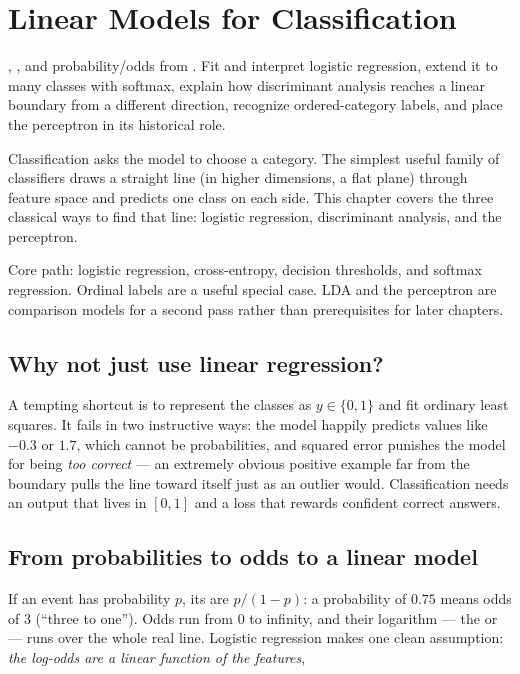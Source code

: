 \chapter{Linear Models for Classification}
\label{ch:classification}

\chapterguide%
  {, , and probability/odds from .}
  {Fit and interpret logistic regression, extend it to many classes with softmax, explain how discriminant analysis reaches a linear boundary from a different direction, recognize ordered-category labels, and place the perceptron in its historical role.}

Classification asks the model to choose a category. The simplest useful family of classifiers draws a straight line (in higher dimensions, a flat plane) through feature space and predicts one class on each side. This chapter covers the three classical ways to find that line: logistic regression, discriminant analysis, and the perceptron.

\begin{firstread}
Core path: logistic regression, cross-entropy, decision thresholds, and softmax regression. Ordinal labels are a useful special case. LDA and the perceptron are comparison models for a second pass rather than prerequisites for later chapters.
\end{firstread}

\section{Why not just use linear regression?}

A tempting shortcut is to represent the classes as $y\in\{0,1\}$ and fit ordinary least squares. It fails in two instructive ways: the model happily predicts values like $-0.3$ or $1.7$, which cannot be probabilities, and squared error punishes the model for being \emph{too correct} --- an extremely obvious positive example far from the boundary pulls the line toward itself just as an outlier would. Classification needs an output that lives in $[0,1]$ and a loss that rewards confident correct answers.

\section{From probabilities to odds to a linear model}

If an event has probability $p$, its  are $p/(1-p)$: a probability of $0.75$ means odds of $3$ (``three to one''). Odds run from $0$ to infinity, and their logarithm --- the  or  --- runs over the whole real line. Logistic regression makes one clean assumption: \emph{the log-odds are a linear function of the features},


